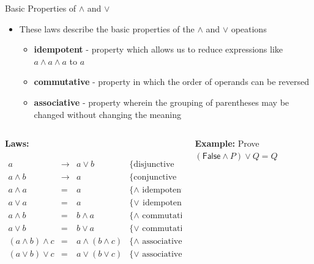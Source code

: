 \documentclass[11pt,t,pdf,xcolor=svgnames,aspectratio=169]{beamer}
\providecommand{\tightlist}{%
  \setlength{\itemsep}{5pt}\setlength{\parskip}{0pt}}
\begin{document}
\begin{frame}{Basic Properties of \(\land\) and \(\lor\)}
\protect\hypertarget{basic-properties-of-land-and-lor}{}
\begin{itemize}
\tightlist
\item
  These laws describe the basic properties of the \(\land\) and \(\lor\)
  opeations

  \begin{itemize}
  \tightlist
  \item
    \textbf{idempotent} - property which allows us to reduce expressions
    like \(a \land a \land a\) to \(a\)
  \item
    \textbf{commutative} - property in which the order of operands can
    be reversed
  \item
    \textbf{associative} - property wherein the grouping of parentheses
    may be changed without changing the meaning
  \end{itemize}
\end{itemize}

\begin{columns}[T]
\begin{column}{0.48\textwidth}
\textbf{Laws:}

\begin{center}
$\begin{array}{rcll}
a                   & \to & a \lor b            & \{\textrm{disjunctive implication}\} \\
a \land b           & \to & a                   & \{\textrm{conjunctive implication}\} \\
a \land a           & =   & a                   & \{\land\,\, \textrm{idempotent}\} \\
a \lor a            & =   & a                   & \{\lor\,\ \textrm{idempotent}\} \\
a \land b           & =   & b \land a           & \{\land\,\, \textrm{commutative}\} \\
a \lor b            & =   & b \lor a            & \{\lor\,\, \textrm{commutative}\} \\
(a \land b) \land c & =   & a \land (b \land c) & \{\land\,\, \textrm{associative}\} \\
(a \lor b) \lor c   & =   & a \lor (b \lor c)   & \{\lor\,\, \textrm{associative}\}
\end{array}$
\end{center}
\end{column}

\begin{column}{0.48\textwidth}
\textbf{Example:} Prove
\(\left(\textsf{False} \land P\right) \lor Q = Q\)


\end{column}
\end{columns}
\end{frame}
\end{document}
